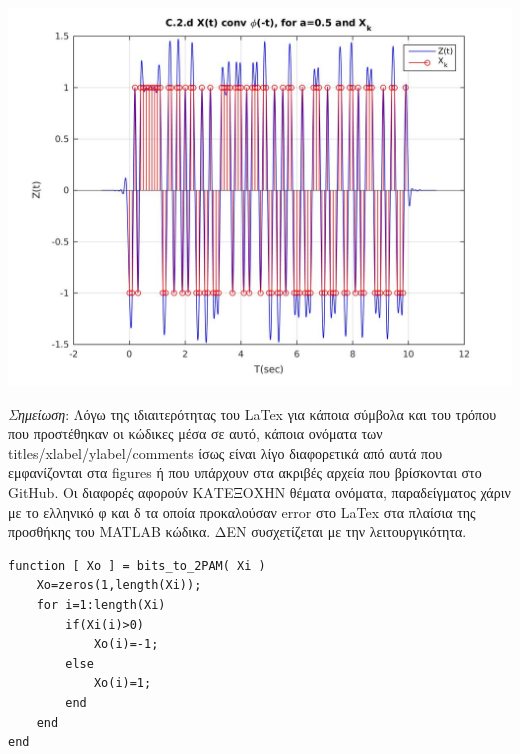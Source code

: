 \documentclass[11pt]{article}
\begin{document}
    \begin{center}
        \includegraphics[scale=0.4]{photos/C.2.d Z(t) and Xk.jpg}
    \end{center} 
    
    
    \newpage
    
\emph{Σημείωση}: Λόγω της ιδιαιτερότητας του LaTex για κάποια σύμβολα και του τρόπου που προστέθηκαν οι κώδικες μέσα σε αυτό, κάποια ονόματα των titles/xlabel/ylabel/comments ίσως είναι λίγο διαφορετικά από αυτά που εμφανίζονται στα figures ή που υπάρχουν στα ακριβές αρχεία που βρίσκονται στο GitHub. Οι διαφορές αφορούν ΚΑΤΕΞΟΧΗΝ θέματα ονόματα, παραδείγματος χάριν με το ελληνικό φ και δ τα οποία προκαλούσαν error στο LaTex στα πλαίσια της προσθήκης του MATLAB κώδικα. ΔΕΝ συσχετίζεται με την λειτουργικότητα.

\begin{lstlisting}[caption = {\texttt{bits\_to\_2PAM.m}}]
function [ Xo ] = bits_to_2PAM( Xi )
    Xo=zeros(1,length(Xi));    
    for i=1:length(Xi)    
        if(Xi(i)>0)          
            Xo(i)=-1;        
        else
            Xo(i)=1;    
        end
    end
end
\end{lstlisting}
\end{document}
